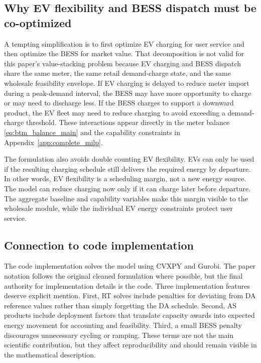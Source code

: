 \documentclass[final,5p,times]{elsarticle}
\begin{document}
\subsection{Why EV flexibility and BESS dispatch must be co-optimized}
A tempting simplification is to first optimize EV charging for user service and then optimize the BESS for market value. That decomposition is not valid for this paper's value-stacking problem because EV charging and BESS dispatch share the same meter, the same retail demand-charge state, and the same wholesale feasibility envelope. If EV charging is delayed to reduce meter import during a peak-demand interval, the BESS may have more opportunity to charge or may need to discharge less. If the BESS charges to support a downward product, the EV fleet may need to reduce charging to avoid exceeding a demand-charge threshold. These interactions appear directly in the meter balance \eqref{eq:btm_balance_main} and the capability constraints in Appendix~\ref{app:complete_milp}.

The formulation also avoids double counting EV flexibility. EVs can only be used if the resulting charging schedule still delivers the required energy by departure. In other words, EV flexibility is a scheduling margin, not a new energy source. The model can reduce charging now only if it can charge later before departure. The aggregate baseline and capability variables make this margin visible to the wholesale module, while the individual EV energy constraints protect user service.

\subsection{Connection to code implementation}
The code implementation solves the model using CVXPY and Gurobi. The paper notation follows the original cleaned formulation where possible, but the final authority for implementation details is the code. Three implementation features deserve explicit mention. First, RT solves include penalties for deviating from DA reference values rather than simply forgetting the DA schedule. Second, AS products include deployment factors that translate capacity awards into expected energy movement for accounting and feasibility. Third, a small BESS penalty discourages unnecessary cycling or ramping. These terms are not the main scientific contribution, but they affect reproducibility and should remain visible in the mathematical description.
\end{document}
